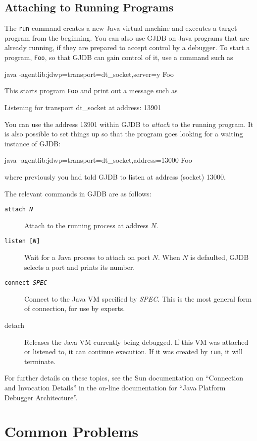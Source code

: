 \documentclass[11pt,twoside]{handout}
\begin{document}
\subsection{Attaching to Running Programs}
The {\tt run} command creates a new Java virtual machine and executes
a target program from the beginning.  You can also use GJDB on Java
programs that are already running, if they are prepared to accept
control by a debugger.  To start a program, {\tt Foo}, so that GJDB
can gain control of it, use a command such as
\begin{program}
java -agentlib:jdwp=transport=dt_socket,server=y Foo
\end{program}
This starts program {\tt Foo} and print out a message such as
\begin{program}
Listening for transport dt_socket at address: 13901
\end{program}
You can use the address 13901 within GJDB to {\it attach\/} to the
running program.  It is also possible to set things up so that the
program goes looking for a waiting instance of GJDB:
\begin{program}
java -agentlib:jdwp=transport=dt_socket,address=13000 Foo
\end{program}
where previously you had told GJDB to listen at address (socket)
13000.  

The relevant commands in GJDB are as follows:
\begin{description}
\item[\tt attach {\it N\/}] Attach to the running process at address
$N$.
\item[{\tt listen [{\it N\/}]}] Wait for a Java process to attach on
port $N$.  When $N$ is defaulted, GJDB selects a port and prints its
number.
\item[\tt connect {\it SPEC\/}] Connect to the Java VM specified by
{\it SPEC}.  This is the most general form of connection, for use by
experts.
\item[detach]  Releases the Java VM currently being debugged.  If this
VM was attached or listened to, it can continue execution.  If it was 
created by {\tt run}, it will terminate.
\end{description}

For further details on these topics, see the Sun documentation on 
``Connection and Invocation Details'' in the on-line documentation for
``Java Platform Debugger Architecture''.


\section{Common Problems}
\end{document}
